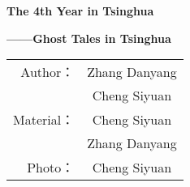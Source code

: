 \documentclass[UTF-8,openright]{ctexbook}
\begin{document}
\begin{titlepage}
	\centering
	\linespread{1.2}
	\vspace*{1cm}
	{ \textbf{The 4th Year in Tsinghua}\par}
	\vspace{0.5cm}
	{ \textbf{——Ghost Tales in Tsinghua}\par}
	\vfill
	\begin{table}[!hb]
		\LARGE
		\centering
		\begin{tabular}{rc}
			Author： &	Zhang Danyang \\
			&			Cheng Siyuan \\
			Material： &	Cheng Siyuan \\
			&			Zhang Danyang \\
			Photo： &	Cheng Siyuan
		\end{tabular}
		\vspace{1cm}
	\end{table}
\end{titlepage}

\pagestyle{headings}


\tableofcontents
\newpage










\end{document}
